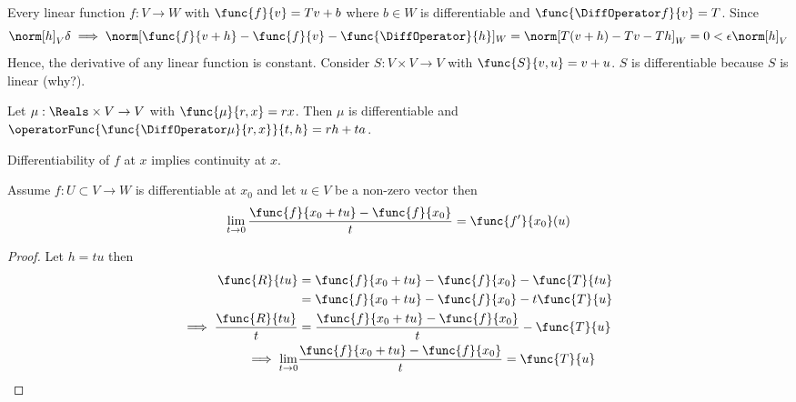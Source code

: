 \begin{example}
    Every linear function \(f : V \to W\) with \(\func{f}{v} = Tv + b\) where \(b \in W\) is differentiable and \(\func{\DiffOperator f}{v} = T\). Since
    \begin{equation*}
        \norm[h]_V \delta \implies \norm[\func{f}{v + h} - \func{f}{v} - \func{\DiffOperator}{h}]_W = \norm[T(v+h) - Tv - Th]_W = 0 < \epsilon \norm[h]_V
    \end{equation*}
    Hence, the derivative of any linear function is constant.
    Consider \(S : V \times V \to V\) with \(\func{S}{v,u} = v + u\). \(S\) is differentiable because \(S\) is linear (why?). %
\end{example}

\begin{example}
    Let \(\mu : \Reals \times V \to V\) with \(\func{\mu}{r,x} = rx\). Then \(\mu\) is differentiable and \(\operatorFunc{\func{\DiffOperator \mu}{r,x}}{t,h} = rh + ta\). %
\end{example}

\begin{proposition}
    Differentiability of \(f\) at \(x\) implies continuity at \(x\).
\end{proposition}

\begin{proposition} \label{eq:partialDerivative}
    Assume \(f: U \subset V \to W\) is differentiable at \(x_0\) and let \(u \in V\) be a non-zero vector then
    \begin{equation*}
        \lim_{t \to 0} \dfrac{\func{f}{x_0 + tu} - \func{f}{x_0}}{t} =\func{f'}{x_0} (u)
    \end{equation*}
\end{proposition}

\begin{proof}
    Let \(h = tu\) then
    \begin{align*}
        \func{R}{tu}                     & = \func{f}{x_0 + tu} - \func{f}{x_0} - \func{T}{tu}            \\
                                         & = \func{f}{x_0 + tu} - \func{f}{x_0} - t\func{T}{u}            \\
        \implies \dfrac{\func{R}{tu}}{t} & = \dfrac{ \func{f}{x_0 + tu} - \func{f}{x_0}}{t} - \func{T}{u} \\
        \implies \lim_{t \to 0}          & \dfrac{ \func{f}{x_0 + tu} - \func{f}{x_0}}{t} = \func{T}{u}
    \end{align*}
\end{proof}

